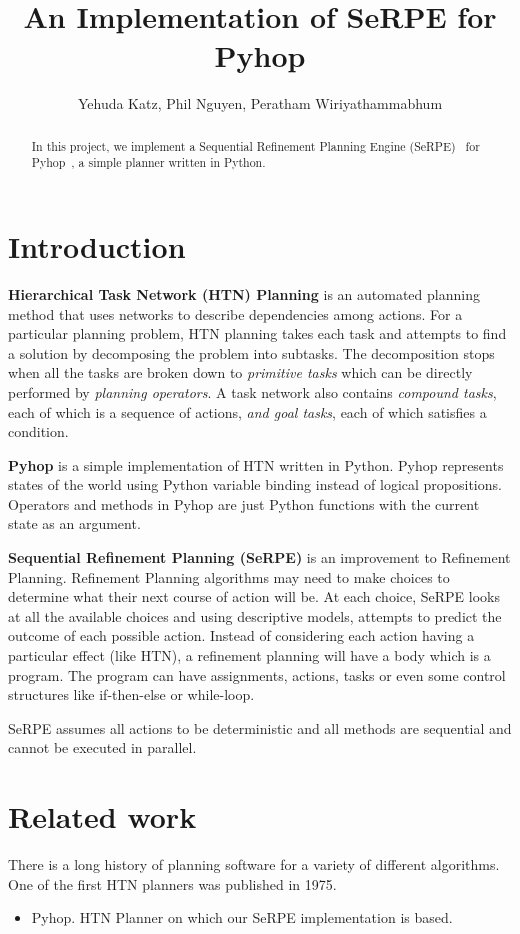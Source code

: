 \documentclass[11pt]{article} %
\title{An Implementation of SeRPE for Pyhop}
\author{Yehuda Katz, Phil Nguyen, Peratham Wiriyathammabhum}
\begin{document}
\maketitle

\begin{abstract}
In this project, we implement a Sequential Refinement Planning Engine
(SeRPE)~\cite{serpe-draft} for Pyhop~\cite{pyhop},
a simple planner written in Python.
\end{abstract}

\section{Introduction}

\textbf{Hierarchical Task Network (HTN) Planning} is an automated planning method that uses networks
to describe dependencies among actions.
For a particular planning problem, HTN planning takes each task and attempts to find a solution
by decomposing the problem into subtasks. The decomposition stops when all the tasks are broken down to \textit{primitive tasks} which can be directly performed by \textit{planning operators}.
A task network also contains 
\textit{compound tasks}, each of which is a sequence of actions,
\textit{and goal tasks}, each of which satisfies a condition.

\textbf{Pyhop} is a simple implementation of HTN written in Python. 
Pyhop represents states of the world using Python variable binding
 instead of logical propositions. Operators and methods in Pyhop are
 just Python functions with the current state as an argument.

\textbf{Sequential Refinement Planning (SeRPE)} is an improvement to Refinement Planning. Refinement Planning algorithms may need to make choices to determine what their next course of action will be. At each choice, SeRPE looks at all the available choices and using descriptive models, attempts to predict the outcome of each possible action.
Instead of considering each action having a particular effect (like HTN), a refinement planning will have a body which
 is a program. The program can have assignments, actions, tasks or
 even some control structures like if-then-else or while-loop.

SeRPE assumes all actions to be deterministic and all methods are 
sequential and cannot be executed in parallel.

\section{Related work}
There is a long history of planning software for a variety of different algorithms. One of the first HTN planners was published in 1975.
\begin{itemize}
  \item Pyhop. HTN Planner on which our SeRPE implementation is based. \cite{pyhop}
  
\end{itemize}
\end{document}
